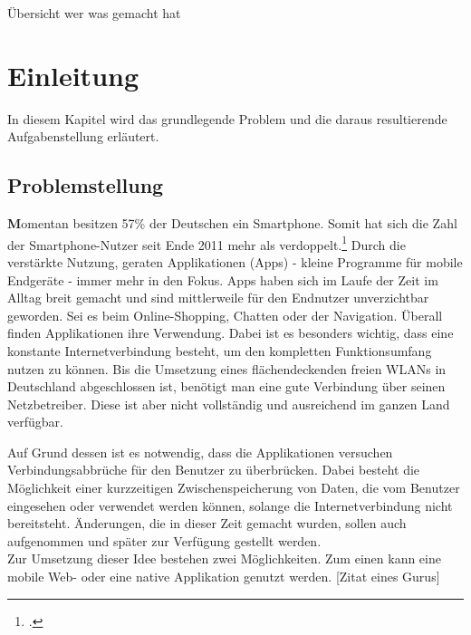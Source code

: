 Übersicht wer was gemacht hat

\chapter{Einleitung}
\label{cha:einleitung}
In diesem Kapitel wird das grundlegende Problem und die daraus resultierende Aufgabenstellung erläutert.

\section{Problemstellung}
\label{sec:problemstellung}

\textbf
Momentan besitzen 57\% der Deutschen ein Smartphone. Somit hat sich die Zahl der Smartphone-Nutzer seit Ende 2011 mehr als verdoppelt.\footcite{Statista-SmartphoneNutzung}
Durch die verstärkte Nutzung, geraten Applikationen (Apps) - kleine Programme für mobile Endgeräte - immer mehr in den Fokus.
Apps haben sich im Laufe der Zeit im Alltag breit gemacht und sind mittlerweile für den Endnutzer unverzichtbar geworden. Sei es beim Online-Shopping, Chatten oder der Navigation. Überall finden Applikationen ihre Verwendung.
Dabei ist es besonders wichtig, dass eine konstante Internetverbindung besteht, um den kompletten Funktionsumfang nutzen zu können.
Bis die Umsetzung eines flächendeckenden freien WLANs in Deutschland abgeschlossen ist, benötigt man eine gute Verbindung über seinen Netzbetreiber. Diese ist aber nicht vollständig und ausreichend im ganzen Land verfügbar.

Auf Grund dessen ist es notwendig, dass die Applikationen versuchen Verbindungsabbrüche für den Benutzer zu überbrücken. Dabei besteht die Möglichkeit einer kurzzeitigen Zwischenspeicherung von Daten, die vom Benutzer eingesehen oder verwendet werden können, solange die Internetverbindung nicht bereitsteht. Änderungen, die in dieser Zeit gemacht wurden, sollen auch aufgenommen und später zur Verfügung gestellt werden.\\
Zur Umsetzung dieser Idee bestehen zwei Möglichkeiten. Zum einen kann eine mobile Web- oder eine native Applikation genutzt werden. [Zitat eines Gurus]




